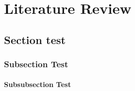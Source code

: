 \chapter{Literature Review}

\lipsum

\section{Section test}

\lipsum[1-11]

\subsection{Subsection Test}

\lipsum[1-9]

\subsubsection{Subsubsection Test}

\lipsum[1-7]